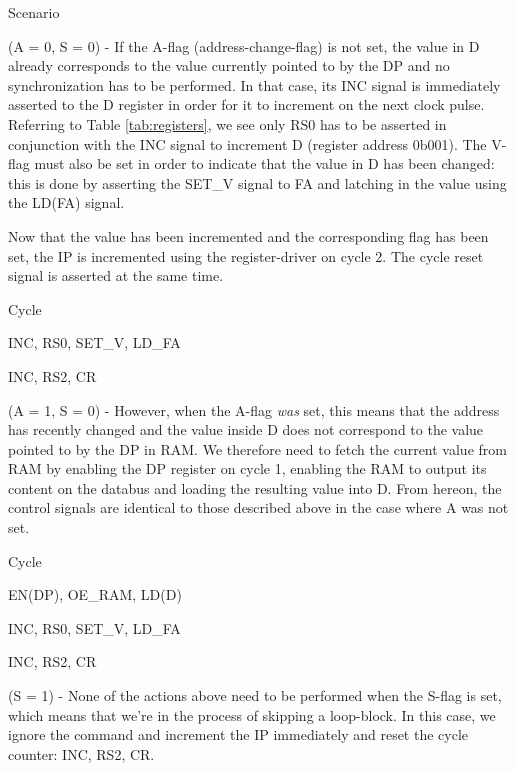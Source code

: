 \begin{labeledenum}{Scenario}
\item (A = 0, S = 0) - If the A-flag (address-change-flag) is not set, the value in D already corresponds to the value currently pointed to by the DP and no synchronization has to be performed. In that case, its INC signal is immediately asserted to the D register in order for it to increment on the next clock pulse. Referring to Table \ref{tab:registers}, we see only RS0 has to be asserted in conjunction with the INC signal to increment D (register address 0b001). The V-flag must also be set in order to indicate that the value in D has been changed: this is done by asserting the SET\_V signal to FA and latching in the value using the LD(FA) signal.

  Now that the value has been incremented and the corresponding flag has been set, the IP is incremented using the register-driver on cycle 2. The cycle reset signal is asserted at the same time.
  
  \begin{labeledenum}{Cycle}
  \item INC, RS0, SET\_V, LD\_FA
  \item INC, RS2, CR
  \end{labeledenum}

\item (A = 1, S = 0) - However, when the A-flag \emph{was} set, this means that the address has recently changed and the value inside D does not correspond to the value pointed to by the DP in RAM. We therefore need to fetch the current value from RAM by enabling the DP register on cycle 1, enabling the RAM to output its content on the databus and loading the resulting value into D.
  From hereon, the control signals are identical to those described above in the case where A was not set.

  \begin{labeledenum}{Cycle}
  \item EN(DP), OE\_RAM, LD(D)
  \item INC, RS0, SET\_V, LD\_FA
  \item INC, RS2, CR
  \end{labeledenum}
  
\item (S = 1) - None of the actions above need to be performed when the S-flag is set, which means that we're in the process of skipping a loop-block. In this case, we ignore the command and increment the IP immediately and reset the cycle counter: INC, RS2, CR.
\end{labeledenum}


